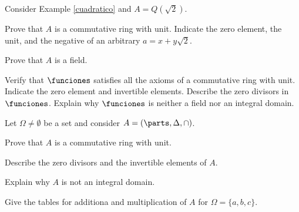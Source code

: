 \documentclass[
    11pt,a4paper,
]{exam}
\begin{document}
\begin{questions}
\begin{ejercicio}
Consider Example \ref{cuadratico} and $A = Q(\sqrt{2})$.
\begin{my_enumerate}
\item Prove that $A$ is a commutative ring with unit. Indicate the zero element, the unit, and the negative of an arbitrary $a=x+y\sqrt{2}$.
\item Prove that $A$ is a field.
\end{my_enumerate}
\end{ejercicio}

\begin{ejercicio}
Verify that $\funciones$ satisfies all the axioms of a commutative ring with unit. Indicate the zero element and invertible elements. Describe the zero divisors in $\funciones$. 
Explain why $\funciones$ is neither a field nor an integral domain.
\end{ejercicio}


\begin{ejercicio}
Let $\Omega \neq \emptyset$ be a set and consider $A = (\parts, \Delta, \cap)$.
\begin{my_enumerate}
\item Prove that $A$  is a commutative ring with unit.
\item Describe the zero divisors and the invertible elements of $A$.
\item Explain why $A$ is not an integral domain.
\item Give the tables for additiona and multiplication of $A$ for $\Omega = \{a,b,c\}$.
\end{my_enumerate}
\end{ejercicio}


\end{questions}
\end{document}
